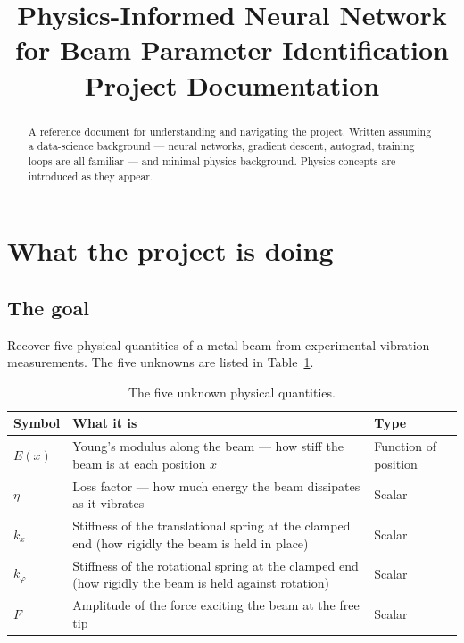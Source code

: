 \documentclass[11pt,a4paper]{article}
\title{
  \vspace{-1.5cm}
  \sffamily\bfseries\Huge Physics-Informed Neural Network \\[0.3em]
  \sffamily\LARGE for Beam Parameter Identification \\[1em]
  \sffamily\Large\normalfont Project Documentation
}
\author{}
\date{}
\begin{document}
\maketitle
\thispagestyle{empty}

\vspace{0.5cm}
\begin{abstract}
\noindent A reference document for understanding and navigating the project. Written assuming a data-science background --- neural networks, gradient descent, autograd, training loops are all familiar --- and minimal physics background. Physics concepts are introduced as they appear.
\end{abstract}

\vspace{0.8cm}
\tableofcontents
\newpage

\section{What the project is doing}

\subsection{The goal}

Recover five physical quantities of a metal beam from experimental vibration measurements. The five unknowns are listed in Table~\ref{tab:unknowns}.

\begin{table}[h]
\centering
\small
\begin{tabularx}{\linewidth}{l X l}
\toprule
\textbf{Symbol} & \textbf{What it is} & \textbf{Type} \\
\midrule
$E(x)$ & Young's modulus along the beam --- how stiff the beam is at each position $x$ & Function of position \\
$\eta$ & Loss factor --- how much energy the beam dissipates as it vibrates & Scalar \\
$k_x$ & Stiffness of the translational spring at the clamped end (how rigidly the beam is held in place) & Scalar \\
$k_\varphi$ & Stiffness of the rotational spring at the clamped end (how rigidly the beam is held against rotation) & Scalar \\
$F$ & Amplitude of the force exciting the beam at the free tip & Scalar \\
\bottomrule
\end{tabularx}
\caption{The five unknown physical quantities.}
\label{tab:unknowns}
\end{table}
\end{document}
